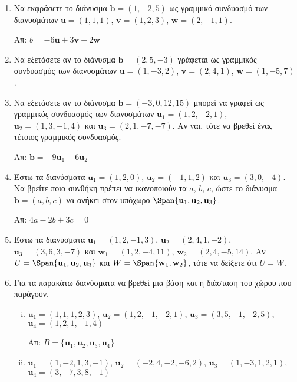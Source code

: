 \begin{enumerate}
    \item Να εκφράσετε το διάνυσμα $ \mathbf{b} = (1,-2,5) $ ως γραμμικό συνδυασμό των διανυσμάτων $
        \mathbf{u} = (1,1,1)$, $ \mathbf{v} = (1,2,3)$, $ \mathbf{w} = (2,-1,1) $.

        \hfill Απ: $ b = -6 \mathbf{u} + 3 \mathbf{v} +2 \mathbf{w} $ 	

    \item Να εξετάσετε αν το διάνυσμα $ \mathbf{b} = (2,5,-3) $ γράφεται ως γραμμικός συνδυασμός των διανυσμάτων $ \mathbf{u} = (1,-3,2)$, $ \mathbf{v} = (2,4,1)$, $ \mathbf{w} = (1,-5,7) $.

    \item Να εξετάσετε αν το διάνυσμα $ \mathbf{b} = (-3,0,12,15) $ μπορεί να γραφεί 
        ως γραμμικός συνδυασμός
        των διανυσμάτων $ \mathbf{u}_{1} = (1,2,-2,1) $, $ \mathbf{u}_{2} = (1,3,-1,4) $ και $
        \mathbf{u}_{3} = (2,1,-7,-7) $. Αν ναι, τότε να βρεθεί ένας τέτοιος γραμμικός συνδυασμός.

        \hfill Απ: $ \mathbf{b} = -9 \mathbf{u}_{1} + 6 \mathbf{u}_{2} $ 

    \item Έστω τα διανύσματα $ \mathbf{u}_{1} = (1,2,0) $, $ \mathbf{u}_{2} = (-1,1,2) $ και $
        \mathbf{u}_{3} = (3,0,-4) $. Να βρείτε ποια συνθήκη πρέπει να ικανοποιούν τα $a$, $b$, $c$,
        ώστε το διάνυσμα $ \mathbf{b} = (a,b,c) $ να ανήκει στον υπόχωρο $ \Span \{ \mathbf{u}_{1},
        \mathbf{u}_{2}, \mathbf{u}_{3} \} $.

        \hfill Απ: $ 4a -2b + 3c = 0 $ 


    \item Έστω τα διανύσματα $ \mathbf{u}_{1} = (1,2,-1,3)$, $\mathbf{u}_{2} = (2,4,1,-2)$, $ \mathbf{u} _{3} = (3,6,3,-7) $ και $ \mathbf{w}_{1} = (1,2,-4,11)$, $ \mathbf{w}_{2} = (2,4,-5,14) $. Αν $
        U = \Span \{ \mathbf{u}_{1}, \mathbf{u}_{2}, \mathbf{u}_{3} \} $ και $ W = \Span \{
        \mathbf{w}_{1}, \mathbf{w}_{2} \} $, τότε να δείξετε ότι $ U=W $.

    \item Για τα παρακάτω διανύσματα να βρεθεί μια βάση και η διάσταση του χώρου που παράγουν.
        \begin{enumerate}[(i)]
            \item $ \mathbf{u}_{1} = (1,1,1,2,3) $, $ \mathbf{u}_{2} = (1,2,-1,-2,1) $, $ \mathbf{u}
                _{3} = (3,5,-1,-2,5) $, $ \mathbf{u}_{4} = (1,2,1,-1,4) $

                \hfill Απ: $ B = \{ \mathbf{u}_{1}, \mathbf{u}_{2}, \mathbf{u}_{3}, \mathbf{u}_{4} \} $ 
            \item $ \mathbf{u}_{1} = (1,-2,1,3,-1) $, $ \mathbf{u}_{2} = (-2,4,-2,-6,2) $, $
                \mathbf{u}_{3} = (1,-3,1,2,1) $, $ \mathbf{u}_{4} = (3,-7,3,8,-1) $


\end{enumerate}
\end{enumerate}
